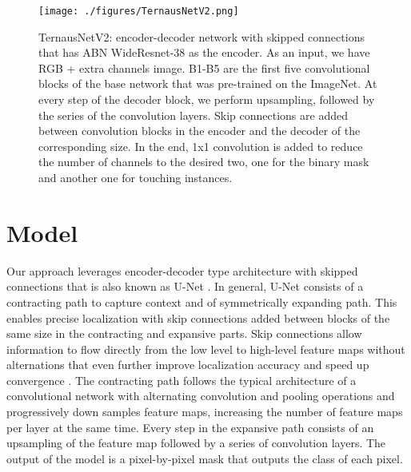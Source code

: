 \documentclass[10pt,twocolumn,letterpaper]{article}
\begin{document}
\begin{figure*}
\begin{center}
\texttt{[image: ./figures/TernausNetV2.png]}
\end{center}
 \caption{TernausNetV2: encoder-decoder network with skipped connections that has ABN WideResnet-38 as the encoder. As an input, we have RGB + extra channels image. B1-B5 are the first five convolutional blocks of the base network that was pre-trained on the ImageNet. At every step of the decoder block, we perform upsampling, followed by the series of the convolution layers. Skip connections are added between convolution blocks in the encoder and the decoder of the corresponding size. In the end, 1x1 convolution is added to reduce the number of channels to the desired two, one for the binary mask and another one for touching instances.
   }
\label{fig::fpn}
\end{figure*}

\section{Model}
Our approach leverages encoder-decoder type architecture with skipped connections that is also known as U-Net \cite{ronneberger2015u}. In general, U-Net consists of a contracting path to capture context and of symmetrically expanding path. This enables precise localization with skip connections added between blocks of the same size in the contracting and expansive parts. Skip connections allow information to flow directly from the low level to high-level feature maps without alternations that even further improve localization accuracy and speed up convergence  \cite{ronneberger2015u}. The contracting path follows the typical architecture of a convolutional network with alternating convolution and pooling operations and progressively down samples feature maps, increasing the number of feature maps per layer at the same time. Every step in the expansive path consists of an upsampling of the feature map followed by a series of convolution layers. The output of the model is a pixel-by-pixel mask that outputs the class of each pixel. 
\end{document}
